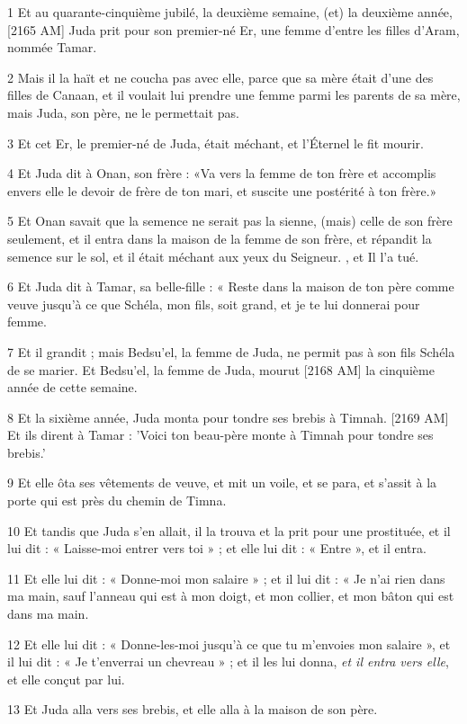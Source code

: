 \par 1 Et au quarante-cinquième jubilé, la deuxième semaine, (et) la deuxième année, [2165 AM] Juda prit pour son premier-né Er, une femme d'entre les filles d'Aram, nommée Tamar.
\par 2 Mais il la haït et ne coucha pas avec elle, parce que sa mère était d'une des filles de Canaan, et il voulait lui prendre une femme parmi les parents de sa mère, mais Juda, son père, ne le permettait pas.
\par 3 Et cet Er, le premier-né de Juda, était méchant, et l'Éternel le fit mourir.
\par 4 Et Juda dit à Onan, son frère : «Va vers la femme de ton frère et accomplis envers elle le devoir de frère de ton mari, et suscite une postérité à ton frère.»
\par 5 Et Onan savait que la semence ne serait pas la sienne, (mais) celle de son frère seulement, et il entra dans la maison de la femme de son frère, et répandit la semence sur le sol, et il était méchant aux yeux du Seigneur. , et Il l'a tué.
\par 6 Et Juda dit à Tamar, sa belle-fille : « Reste dans la maison de ton père comme veuve jusqu'à ce que Schéla, mon fils, soit grand, et je te lui donnerai pour femme.
\par 7 Et il grandit ; mais Bedsu'el, la femme de Juda, ne permit pas à son fils Schéla de se marier. Et Bedsu'el, la femme de Juda, mourut [2168 AM] la cinquième année de cette semaine.
\par 8 Et la sixième année, Juda monta pour tondre ses brebis à Timnah. [2169 AM] Et ils dirent à Tamar : 'Voici ton beau-père monte à Timnah pour tondre ses brebis.'
\par 9 Et elle ôta ses vêtements de veuve, et mit un voile, et se para, et s'assit à la porte qui est près du chemin de Timna.
\par 10 Et tandis que Juda s'en allait, il la trouva et la prit pour une prostituée, et il lui dit : « Laisse-moi entrer vers toi » ; et elle lui dit : « Entre », et il entra.
\par 11 Et elle lui dit : « Donne-moi mon salaire » ; et il lui dit : « Je n'ai rien dans ma main, sauf l'anneau qui est à mon doigt, et mon collier, et mon bâton qui est dans ma main.
\par 12 Et elle lui dit : « Donne-les-moi jusqu'à ce que tu m'envoies mon salaire », et il lui dit : « Je t'enverrai un chevreau » ; et il les lui donna, \textit{et il entra vers elle}, et elle conçut par lui.
\par 13 Et Juda alla vers ses brebis, et elle alla à la maison de son père.
